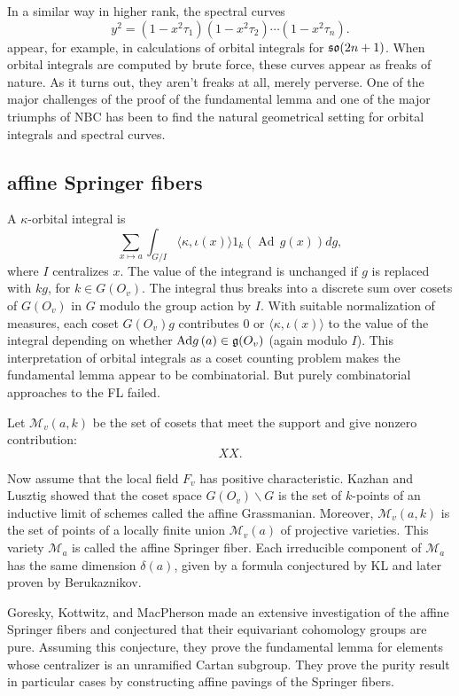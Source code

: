 \documentclass[brochure,english,12pt]{bourbaki}
\def\op#1{{\operatorname{#1}}}
\def\so{\frak{so}}
\def\g{\frak{g}}
\def\b{\backslash }
\def\M{{\mathcal M}}
\begin{document}
In a similar way in higher rank,  the spectral curves
\[
y^2 = (1-x^2 \tau_1)(1-x^2 \tau_2)\cdots (1-x^2 \tau_n).
\]
appear, for example, in calculations of orbital integrals for
$\so(2n+1)$.  When orbital integrals are computed by brute force,
these curves appear as freaks of nature.  As it turns
out, they aren't freaks at all, merely perverse.  One of the major
challenges of the proof of the fundamental lemma and one of the major
triumphs of NBC has been to find the natural geometrical setting for
orbital integrals and spectral curves.

\subsection{affine Springer fibers}



A $\kappa$-orbital integral is
\[
\sum_ {x\mapsto a} \int_{G/I} \langle\kappa,\iota(x)\rangle 1_k (\op{Ad}\, g(x)) dg,
\]
where $I$ centralizes $x$.  The value of the integrand is unchanged if
$g$ is replaced with $k g$, for $k\in G(O_v)$.  The integral thus
breaks into a discrete sum over cosets of $G(O_v)$ in $G$ modulo the
group action by $I$.  With suitable normalization of measures, each
coset $G(O_v)g$ contributes $0$ or $\langle\kappa,\iota(x)\rangle$ to
the value of the integral depending on whether $\op{Ad}g\,(a) \in
\g(O_v)$ (again modulo $I$).  This interpretation of orbital integrals
as a coset counting problem makes the fundamental lemma appear to be
combinatorial.  But purely combinatorial approaches to the FL failed.

Let $\M_v(a,k)$ be the set of cosets that meet the support and give nonzero contribution:
\[
XX.
\]


Now assume that the local field $F_v$ has positive characteristic.
Kazhan and Lusztig showed that the coset space $G(O_v)\b G$ is the set of
$k$-points of an inductive limit of schemes called the affine Grassmanian.   
Moreover, $\M_v(a,k)$ is the set of points of a locally finite union
$\M_v(a)$ of projective varieties.  This variety $\M_a$ is called the affine Springer
fiber.  Each irreducible component of $\M_a$ has the same dimension
$\delta(a)$, given by a formula conjectured by KL and later proven by Berukaznikov.

Goresky, Kottwitz, and MacPherson made an extensive investigation of
the affine Springer fibers and conjectured that their equivariant
cohomology groups are pure.  Assuming this conjecture, they prove the
fundamental lemma for elements whose centralizer is an unramified
Cartan subgroup.  They prove the purity result in particular cases by
constructing affine pavings of the Springer fibers.
\end{document}
